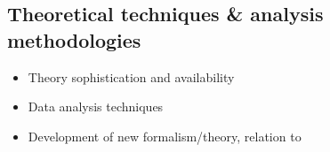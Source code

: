 \subsection{Theoretical techniques \& analysis methodologies}

\begin{itemize}
\item Theory sophistication and availability
\item Data analysis techniques
\item Development of new formalism/theory, relation to 
\end{itemize}